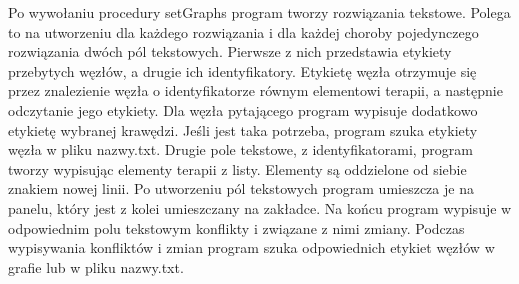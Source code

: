 Po wywołaniu procedury setGraphs program tworzy rozwiązania tekstowe. Polega to na utworzeniu dla każdego rozwiązania i dla każdej choroby pojedynczego rozwiązania dwóch pól tekstowych. Pierwsze z nich przedstawia etykiety przebytych węzłów, a drugie ich identyfikatory. 
Etykietę węzła otrzymuje się przez znalezienie węzła o identyfikatorze równym elementowi terapii, a następnie odczytanie jego etykiety. Dla węzła pytającego program wypisuje dodatkowo etykietę wybranej krawędzi. Jeśli jest taka potrzeba, program szuka etykiety węzła w pliku nazwy.txt. Drugie pole tekstowe, z identyfikatorami, program tworzy wypisując elementy terapii z listy. Elementy są oddzielone od siebie znakiem nowej linii. 
Po utworzeniu pól tekstowych program umieszcza je na panelu, który jest z kolei umieszczany na zakładce. Na końcu program wypisuje w odpowiednim polu tekstowym konflikty i związane z nimi zmiany. Podczas wypisywania konfliktów i zmian program szuka odpowiednich etykiet węzłów w grafie lub w pliku nazwy.txt. 


